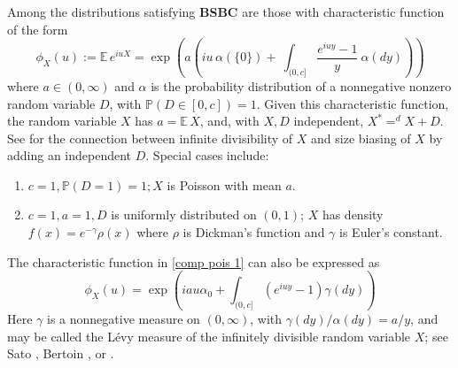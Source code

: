 \documentclass[smallextended,envcountsect]{svjour3}
\begin{document}
Among the distributions satisfying {\bf BSBC}
are those with characteristic function of the form
\begin{equation}\label{comp pois 1}
 \phi_X(u) := {\mathbb{E \,}} e^{i u X}  =\exp \left( a \left( i u \,  \alpha(\{0\}) +\  \int_{(0,c]} \frac{e^{iuy}-1}{y} \
   \alpha(dy) \right) \right)
\end{equation}
where $a \in (0,\infty)$ and  $\alpha$ is the probability distribution of a nonnegative nonzero random variable $D$, with ${\mathbb{P}}(D\in [0,c])=1$.  Given this characteristic function, the random variable $X$ has  $a={\mathbb{E \,}} X$, and, with $X,D$ independent, $X^*=^d X+D$.  See \cite{AGK} for the connection between infinite divisibility of $X$ and size biasing of $X$ by adding an independent $D$.  Special cases include:
\begin{enumerate}
 \item $c=1, {\mathbb{P}}(D=1)=1; X$ is Poisson with mean $a$.

 \item $c=1,a=1, D$ is uniformly distributed on $(0,1)$; $X$ has density $f(x) = e^{-\gamma} \rho(x)$ where $\rho$ is Dickman's function and $\gamma$ is Euler's constant.

 \end{enumerate}
The characteristic function in \eqref{comp pois 1} can also be expressed as
 \begin{equation}\label{comp pois 2}
 \phi_X(u)  =
   \exp \left(   i a u \alpha_0+  \int_{(0,c]} \left(e^{iuy}-1 \right)  \gamma(dy) \right)
\end{equation}
Here $\gamma$ is a nonnegative measure on $(0,\infty)$, with $\gamma(dy) /\alpha(dy) = a/y$, and may be called  the L\'evy measure of the infinitely divisible random variable $X$;  see Sato \cite[Section 51]{sato}, Bertoin \cite[Section 1.2]{bertoin}, or \cite{AGK}.
\end{document}

